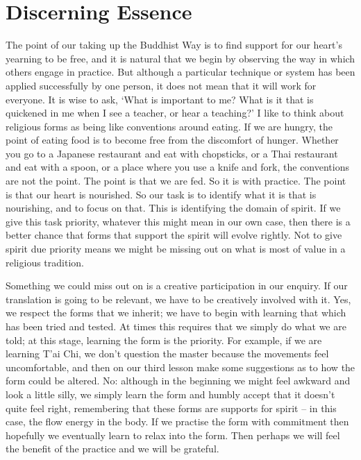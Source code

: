 \section{Discerning Essence}

The point of our taking up the Buddhist Way is to find support for our heart's yearning to be free, and it is natural that we begin by observing the way in which others engage in practice. But although a particular technique or system has been applied successfully by one person, it does not mean that it will work for everyone. It is wise to ask, `What is important to me? What is it that is quickened in me when I see a teacher, or hear a teaching?' I like to think about religious forms as being like conventions around eating. If we are hungry, the point of eating food is to become free from the discomfort of hunger.  Whether you go to a Japanese restaurant and eat with chopsticks, or a Thai restaurant and eat with a spoon, or a place where you use a knife and fork, the conventions are not the point. The point is that we are fed. So it is with practice. The point is that our heart is nourished. So our task is to identify what it is that is nourishing, and to focus on that. This is identifying the domain of spirit. If we give this task priority, whatever this might mean in our own case, then there is a better chance that forms that support the spirit will evolve rightly. Not to give spirit due priority means we might be missing out on what is most of value in a religious tradition.

Something we could miss out on is a creative participation in our
enquiry. If our translation is going to be relevant, we have to be
creatively involved with it. Yes, we respect the forms that we inherit;
we have to begin with learning that which has been tried and tested. At
times this requires that we simply do what we are told; at this stage,
learning the form is the priority. For example, if we are learning T'ai
Chi, we don't question the master because the movements feel
uncomfortable, and then on our third lesson make some suggestions as to
how the form could be altered. No: although in the beginning we might
feel awkward and look a little silly, we simply learn the form and
humbly accept that it doesn't quite feel right, remembering that these
forms are supports for spirit -- in this case, the flow energy in the body. If we practise the form with commitment then hopefully we eventually learn to relax into the form. Then perhaps we will feel the benefit of the practice and we will be grateful.

